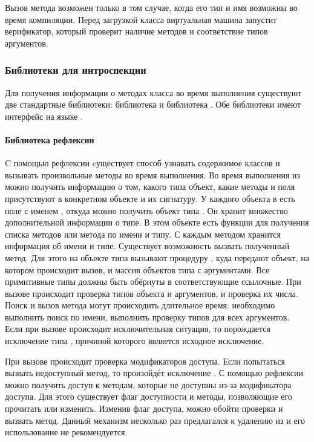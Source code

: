 Вызов метода возможен только в том случае, когда его тип и имя возможны во время компиляции. Перед загрузкой класса виртуальная машина запустит верификатор, который проверит наличие методов и соответствие типов аргументов.

\subsubsection{Библиотеки для интроспекции}
Для получения информации о методах класса во время выполнения существуют две стандартные библиотеки: библиотека  и библиотека . Обе библиотеки имеют интерфейс на языке .

\paragraph{Библиотека рефлексии}
C помощью рефлексии\cite{jvm:reflection} cуществует способ узнавать содержимое классов и вызывать произвольные методы во время выполнения. Во время выполнения из  можно получить информацию о том, какого типа объект, какие методы и поля присутствуют в конкретном объекте и их сигнатуру. У каждого объекта в  есть поле с именем , откуда можно получить объект типа . Он хранит множество дополнительной информации о типе. В этом объекте есть функции для получения списка методов или метода по имени и типу. С каждым методом хранится информация об имени и типе. Существует возможность вызвать полученный метод. Для этого на объекте типа  вызывают процедуру , куда передают объект, на котором происходит вызов, и массив объектов типа  с аргументами. Все примитивные типы должны быть обёрнуты в соответствующие ссылочные. При вызове происходит проверка типов объекта и аргументов, и проверка их числа. Поиск и вызов метода могут происходить длительное время: необходимо выполнить поиск по имени, выполнить проверку типов для всех аргументов. Если при вызове происходит исключительная ситуация, то порождается исключение типа , причиной которого является исходное исключение.

При вызове происходит проверка модификаторов доступа. Если попытаться вызвать недоступный метод, то произойдёт исключение . С помощью рефлексии можно получить доступ к методам, которые не доступны из-за модификатора доступа. Для этого существует флаг доступности и методы, позволяющие его прочитать или изменить. Изменив флаг доступа, можно обойти проверки и вызвать метод. Данный механизм несколько раз предлагался к удалению из  и его использование не рекомендуется.

